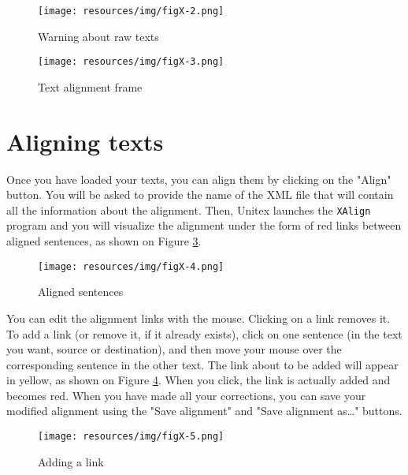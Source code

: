\begin{figure}[!ht]
\begin{center}
\texttt{[image: resources/img/figX-2.png]}
\caption{Warning about raw texts\label{fig-x-tei-name}}
\end{center}
\end{figure}
\clearpage


\begin{figure}[!ht]
\begin{center}
\texttt{[image: resources/img/figX-3.png]}
\caption{Text alignment frame\label{fig-x-frame}}
\end{center}
\end{figure}

\section{Aligning texts}
Once you have loaded your texts, you can align them by clicking on the "Align"
button. You will be asked to provide the name of the XML file that will
contain all the information about the alignment. Then, Unitex launches the
\verb+XAlign+ program and you will visualize the alignment under the form of
red links between aligned sentences, as shown on Figure \ref{fig-x-links}.

\begin{figure}[!ht]
\begin{center}
\texttt{[image: resources/img/figX-4.png]}
\caption{Aligned sentences\label{fig-x-links}}
\end{center}
\end{figure}

\bigskip
\noindent You can edit the alignment links with the mouse. Clicking on a link
removes it. To add a link (or remove it, if it already exists), click on one
sentence (in the text you want, source or destination), and then move your mouse
over the corresponding sentence in the other text. The link about to be added
will appear in yellow, as shown on Figure \ref{fig-x-adding-a-link}. When you
click, the link is actually added and becomes red. When you have made all your
corrections, you can save your modified alignment using the "Save alignment"
and "Save alignment as\ldots" buttons.

\begin{figure}[!ht]
\begin{center}
\texttt{[image: resources/img/figX-5.png]}
\caption{Adding a link\label{fig-x-adding-a-link}}
\end{center}
\end{figure}

